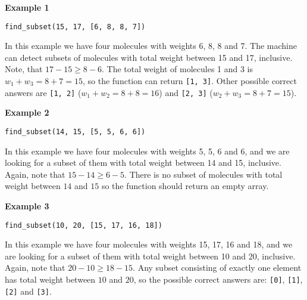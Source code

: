 \textbf{Example 1}

\texttt{find\_subset(15, 17, [6, 8, 8, 7])}

In this example we have four molecules with weights 6, 8, 8 and 7. The machine can detect subsets of molecules with total weight between 15 and 17, inclusive. Note, that $17-15\geq 8-6$. The total weight of molecules 1 and 3 is $w_1 + w_3 = 8 + 7 = 15$, so the function can return \texttt{[1, 3]}. Other possible correct answers are \texttt{[1, 2]} 
($w_1 + w_2 = 8 + 8 = 16$) and \texttt{[2, 3]} ($w_2 + w_3 = 8 + 7 = 15$).

\textbf{Example 2}

\texttt{find\_subset(14, 15, [5, 5, 6, 6]) }

In this example we have four molecules with weights 5, 5, 6 and 6, and we are looking for a subset of them with total weight between 14 and 15, inclusive. Again, note that $15 - 14 \geq 6 - 5$. There is no subset of molecules with total weight between $14$ and $15$ so the function should return an empty array.

\textbf{Example 3}

\texttt{find\_subset(10, 20, [15, 17, 16, 18]) }

In this example we have four molecules with weights 15, 17, 16 and 18, and we are looking for a subset of them with total weight between 10 and 20, inclusive. Again, note that $20 - 10 \geq 18 - 15$. Any subset consisting of exactly one element has total weight between $10$ and $20$, so the possible correct answers are: \texttt{[0]}, \texttt{[1]}, \texttt{[2]} and \texttt{[3]}.



